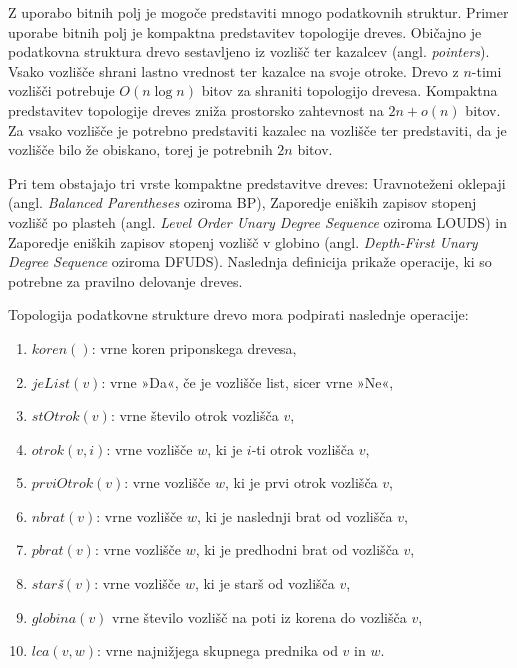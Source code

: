 Z uporabo bitnih polj je mogoče predstaviti mnogo podatkovnih struktur. Primer uporabe bitnih polj je kompaktna predstavitev topologije dreves. Običajno je podatkovna struktura drevo sestavljeno iz vozlišč ter kazalcev (angl. \textit{pointers}). Vsako vozlišče shrani lastno vrednost ter kazalce na svoje otroke. Drevo z $n$-timi vozlišči potrebuje $O(n\log{n})$ bitov za shraniti topologijo drevesa. Kompaktna predstavitev topologije dreves zniža prostorsko zahtevnost na $2n+o(n)$ bitov. Za vsako vozlišče je potrebno predstaviti kazalec na vozlišče ter predstaviti, da je vozlišče bilo že obiskano, torej je potrebnih $2n$ bitov.

Pri tem obstajajo tri vrste kompaktne predstavitve dreves: Uravnoteženi oklepaji (angl. \textit{Balanced Parentheses} oziroma BP), Zaporedje eniških zapisov stopenj vozlišč po plasteh (angl. \textit{Level Order Unary Degree Sequence} oziroma LOUDS) in Zaporedje eniških zapisov stopenj vozlišč v globino (angl. \textit{Depth-First Unary Degree Sequence} oziroma DFUDS).
Naslednja definicija prikaže operacije, ki so potrebne za pravilno delovanje dreves.

\begin{defi}\label{def:drevo}
    Topologija podatkovne strukture drevo mora podpirati naslednje operacije:
    \begin{enumerate}
        \item $koren()$: vrne koren priponskega drevesa,
        \item $jeList(v)$: vrne »Da«, če je vozlišče list, sicer vrne »Ne«,
        \item $stOtrok(v)$: vrne število otrok vozlišča $v$,
        \item $otrok(v,i)$: vrne vozlišče $w$, ki je $i$-ti otrok vozlišča $v$,
        \item $prviOtrok(v)$: vrne vozlišče $w$, ki je prvi otrok vozlišča $v$,
        \item $nbrat(v)$: vrne vozlišče $w$, ki je naslednji brat od vozlišča $v$,
        \item $pbrat(v)$: vrne vozlišče $w$, ki je predhodni brat od vozlišča $v$,
        \item $star$\textit{š}$(v)$: vrne vozlišče $w$, ki je starš od vozlišča $v$,
        \item $globina(v)$ vrne število vozlišč na poti iz korena do vozlišča $v$,
        \item $lca(v,w)$: vrne najnižjega skupnega prednika od $v$ in $w$.
    \end{enumerate}
\end{defi}

